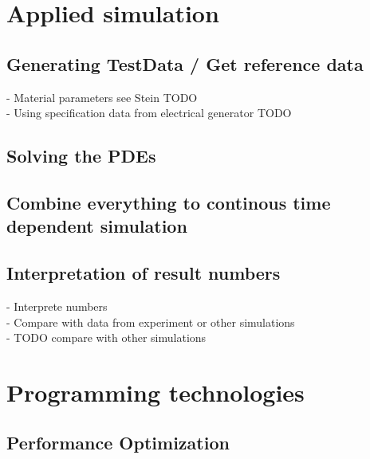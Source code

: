 \documentclass[parskip=half, titlepage=yes, 12pt, BCOR=12mm, DIV=calc]{scrartcl}
\begin{document}
\section{Applied simulation}
\subsection{Generating TestData / Get reference data}
- Material parameters see Stein TODO \\
- Using specification data from electrical generator TODO \\

\subsection{Solving the PDEs}

\subsection{Combine everything to continous time dependent simulation}

\subsection{Interpretation of result numbers}
- Interprete numbers \\
- Compare with data from experiment or other simulations \\
- TODO compare with other simulations \\

\section{Programming technologies}

\subsection{Performance Optimization}
\end{document}
